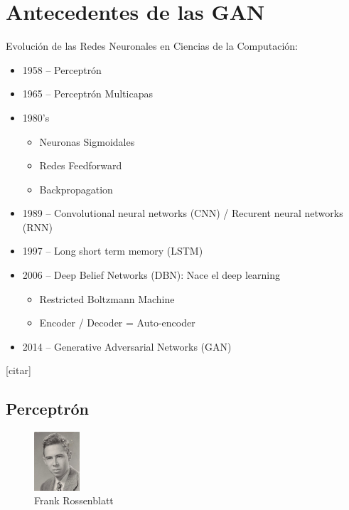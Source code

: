 \documentclass[a4paper]{article}
\begin{document}
\section{Antecedentes de las GAN}
Evolución de las Redes Neuronales en Ciencias de la Computación:
\begin{itemize}

    \item{1958 – Perceptrón}
    \item{1965 – Perceptrón Multicapas}
    \item{1980’s
    	\begin{itemize}
    	\item{Neuronas Sigmoidales}
        \item{Redes Feedforward}
        \item{Backpropagation}
        \end{itemize}
        }
    \item{1989 – Convolutional neural networks (CNN) / Recurent neural networks (RNN)}
    \item{1997 – Long short term memory (LSTM)}
    \item{2006 – Deep Belief Networks (DBN): Nace el deep learning}
    \begin{itemize}
    
        \item{Restricted Boltzmann Machine}
        \item{Encoder / Decoder = Auto-encoder}
        
    \end{itemize}
    \item{2014 – Generative Adversarial Networks (GAN)}

\end{itemize}[citar]

\newpage
\subsection{Perceptrón}
\begin{figure} %
    \centering
    \includegraphics[width=0.15\textwidth]{./images/220px-Rosenblatt_21.jpg}
    \caption{Frank Rossenblatt}
\end{figure}
\end{document}
